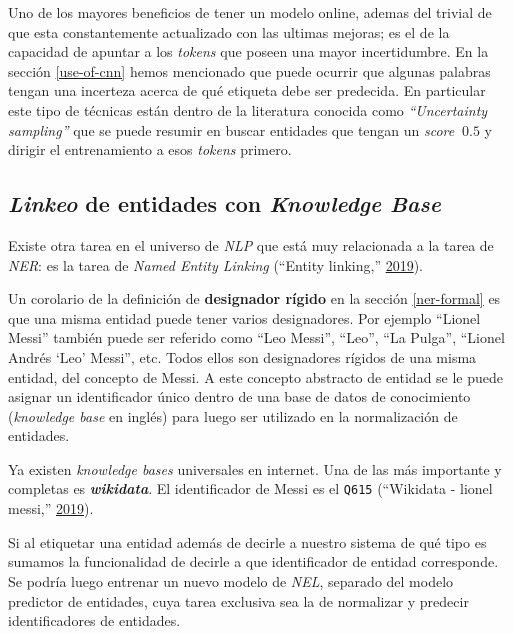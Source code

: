 \documentclass[12pt,a4paper,]{scrartcl}
\begin{document}
Uno de los mayores beneficios de tener un modelo online, ademas del trivial de que esta constantemente actualizado con las ultimas mejoras; es el de la capacidad de apuntar a los \emph{tokens} que poseen una mayor incertidumbre. En la sección \ref{use-of-cnn} hemos mencionado que puede ocurrir que algunas palabras tengan una incerteza acerca de qué etiqueta debe ser predecida. En particular este tipo de técnicas están dentro de la literatura conocida como \emph{\enquote{Uncertainty sampling}} que se puede resumir en buscar entidades que tengan un \emph{score} \(~ 0.5\) y dirigir el entrenamiento a esos \emph{tokens} primero.

\hypertarget{linkeo-de-entidades-con-knowledge-base}{%
\subsection{\texorpdfstring{\emph{Linkeo} de entidades con \emph{Knowledge Base}}{Linkeo de entidades con Knowledge Base}}\label{linkeo-de-entidades-con-knowledge-base}}

Existe otra tarea en el universo de \emph{NLP} que está muy relacionada a la tarea de \emph{NER}: es la tarea de \emph{Named Entity Linking} (``Entity linking,'' \protect\hyperlink{ref-wiki_nel}{2019}).

Un corolario de la definición de \textbf{designador rígido} en la sección \ref{ner-formal} es que una misma entidad puede tener varios designadores. Por ejemplo \enquote{Lionel Messi} también puede ser referido como \enquote{Leo Messi}, \enquote{Leo}, \enquote{La Pulga}, \enquote{Lionel Andrés \enquote{Leo} Messi}, etc. Todos ellos son designadores rígidos de una misma entidad, del concepto de Messi. A este concepto abstracto de entidad se le puede asignar un identificador único dentro de una base de datos de conocimiento (\emph{knowledge base} en inglés) para luego ser utilizado en la normalización de entidades.

Ya existen \emph{knowledge bases} universales en internet. Una de las más importante y completas es \textbf{\emph{wikidata}}. El identificador de Messi es el \texttt{Q615} (``Wikidata - lionel messi,'' \protect\hyperlink{ref-wikidata_messi}{2019}).

Si al etiquetar una entidad además de decirle a nuestro sistema de qué tipo es sumamos la funcionalidad de decirle a que identificador de entidad corresponde. Se podría luego entrenar un nuevo modelo de \emph{NEL}, separado del modelo predictor de entidades, cuya tarea exclusiva sea la de normalizar y predecir identificadores de entidades.
\end{document}
